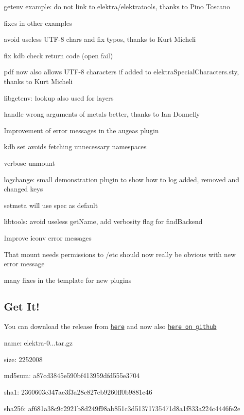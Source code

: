 \begin{DoxyItemize}
\item getenv example\+: do not link to elektra/elektratools, thanks to Pino Toscano
\item fixes in other examples
\item avoid useless U\+T\+F-\/8 chars and fix typos, thanks to Kurt Micheli
\item fix kdb check return code (open fail)
\item pdf now also allows U\+T\+F-\/8 characters if added to elektra\+Special\+Characters.\+sty, thanks to Kurt Micheli
\item libgetenv\+: lookup also used for layers
\item handle wrong arguments of metals better, thanks to Ian Donnelly
\item Improvement of error messages in the augeas plugin
\item {\ttfamily kdb set} avoids fetching unnecessary namespaces
\item verbose unmount
\item logchange\+: small demonstration plugin to show how to log added, removed and changed keys
\item setmeta will use spec as default
\item libtools\+: avoid useless get\+Name, add verbosity flag for find\+Backend
\item Improve iconv error messages
\item That mount needs permissions to /etc should now really be obvious with new error message
\item many fixes in the template for new plugins
\end{DoxyItemize}

\subsection*{Get It!}

You can download the release from \href{http://www.libelektra.org/ftp/elektra/releases/elektra-0.8.14.tar.gz}{\tt here} and now also \href{https://github.com/ElektraInitiative/ftp/tree/master/releases/elektra-0.8.14.tar.gz}{\tt here on github}


\begin{DoxyItemize}
\item name\+: elektra-\/0...\+tar.\+gz
\item size\+: 2252008
\item md5sum\+: a87cd3845e590bf413959dfd555e3704
\item sha1\+: 2360603c347ae3f3a28e827eb9260ff0b9881e46
\item sha256\+: af681a38c9c2921b8d249f98ab851c3d51371735471d8a1f833a224c4446fe2e
\end{DoxyItemize}

